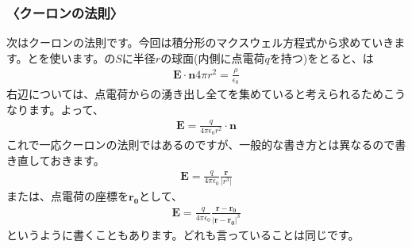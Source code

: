 \documentclass[10pt,b5paper,papersize,dvipdfmx]{jsbook}
\begin{document}
\subsubsection{〈クーロンの法則〉}
次はクーロンの法則です。今回は積分形のマクスウェル方程式から求めていきます。とを使います。の$S$に半径$r$の球面(内側に点電荷$q$を持つ)をとると、は
\begin{align}
\mathbf{E}\cdot\mathbf{n}4\pi r^2 = \frac{\rho}{\epsilon_0}
\end{align}
右辺については、点電荷からの湧き出し全てを集めていると考えられるためこうなります。よって、
\begin{align}
\mathbf{E} = \frac{q}{4\pi\epsilon_0 r^2}\cdot\mathbf{n}
\end{align}
これで一応クーロンの法則ではあるのですが、一般的な書き方とは異なるので書き直しておきます。
\begin{align}
\mathbf{E} = \frac{q}{4\pi\epsilon_0}\frac{\mathbf{r}}{|r^3|}
\end{align}
または、点電荷の座標を$\mathbf{r_0}$として、
\begin{align}
\mathbf{E} = \frac{q}{4\pi\epsilon_0}\frac{\mathbf{r}-\mathbf{r_0}}{|\mathbf{r}-\mathbf{r_0}|^3}
\end{align}
というように書くこともあります。どれも言っていることは同じです。
\end{document}
